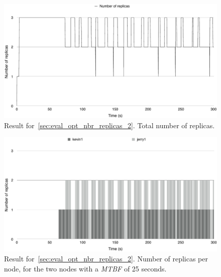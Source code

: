 \documentclass{cslthse-msc}
\begin{document}
\begin{figure}[!hbt]
\centering
\includegraphics[scale=0.5]{images/results/optimal_replicas/2/total.pdf}
\caption[Total number of replicas in ~\cref{sec:eval_opt_nbr_replicas_2}]{Result for~\cref{sec:eval_opt_nbr_replicas_2}. Total number of replicas.} \label{fig:exp_opt_replicas_total_2}
\end{figure}

\begin{figure}[!hbt]
\centering
\includegraphics[scale=0.5]{images/results/optimal_replicas/2/MTBF_25.pdf}
\caption[Number of replicas in ~\cref{sec:eval_opt_nbr_replicas_2} on nodes with \emph{MTBF} = 25 s]{Result for~\cref{sec:eval_opt_nbr_replicas_2}. Number of replicas per node, for the two nodes with a \emph{MTBF} of 25 seconds.} \label{fig:exp_opt_replicas_MTBF_25_2}
\end{figure}
\end{document}
